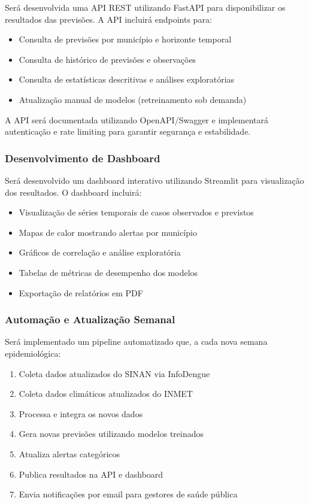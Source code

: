 Será desenvolvida uma API REST utilizando FastAPI para disponibilizar os resultados das previsões. A API incluirá endpoints para:
\begin{itemize}
    \item Consulta de previsões por município e horizonte temporal
    \item Consulta de histórico de previsões e observações
    \item Consulta de estatísticas descritivas e análises exploratórias
    \item Atualização manual de modelos (retreinamento sob demanda)
\end{itemize}

A API será documentada utilizando OpenAPI/Swagger e implementará autenticação e rate limiting para garantir segurança e estabilidade.

\subsubsection{Desenvolvimento de Dashboard}

Será desenvolvido um dashboard interativo utilizando Streamlit para visualização dos resultados. O dashboard incluirá:
\begin{itemize}
    \item Visualização de séries temporais de casos observados e previstos
    \item Mapas de calor mostrando alertas por município
    \item Gráficos de correlação e análise exploratória
    \item Tabelas de métricas de desempenho dos modelos
    \item Exportação de relatórios em PDF
\end{itemize}

\subsubsection{Automação e Atualização Semanal}

Será implementado um pipeline automatizado que, a cada nova semana epidemiológica:
\begin{enumerate}
    \item Coleta dados atualizados do SINAN via InfoDengue
    \item Coleta dados climáticos atualizados do INMET
    \item Processa e integra os novos dados
    \item Gera novas previsões utilizando modelos treinados
    \item Atualiza alertas categóricos
    \item Publica resultados na API e dashboard
    \item Envia notificações por email para gestores de saúde pública
\end{enumerate}

